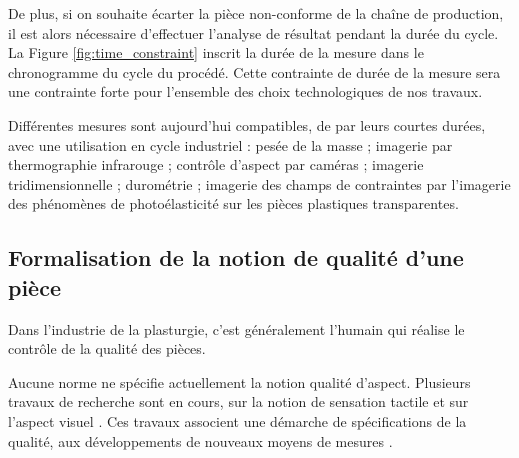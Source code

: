 De plus, si on souhaite écarter la pièce non-conforme de la chaîne de production, il est alors nécessaire d'effectuer l'analyse de résultat pendant la durée du cycle.
La Figure \ref{fig:time_constraint} inscrit la durée de la mesure dans le chronogramme du cycle du procédé.  %
Cette contrainte de durée de la mesure sera une contrainte forte pour l'ensemble des choix technologiques de nos travaux.

Différentes mesures sont aujourd'hui compatibles, de par leurs courtes durées, avec une utilisation en cycle industriel : pesée de la masse ; imagerie par thermographie infrarouge ; contrôle d'aspect par caméras ; imagerie tridimensionnelle \cite{schwenke_optical_2002} ; durométrie ; imagerie des champs de contraintes par l'imagerie des phénomènes de photoélasticité sur les pièces plastiques transparentes.


\subsection{Formalisation de la notion de qualité d'une pièce}
Dans l'industrie de la plasturgie, c'est généralement l'humain qui réalise le contrôle de la qualité des pièces.

Aucune norme ne spécifie actuellement la notion qualité d'aspect.
Plusieurs travaux de recherche sont en cours, sur la notion de sensation tactile \cite{bruno_albert_formalisation_2016, albert_generic_2016, albert_smart_2017, albert_smart_2019, albert_maitrise_2019} et sur l'aspect visuel \cite{desage_syntactic_2015}.
Ces travaux associent une démarche de spécifications de la qualité, aux développements de nouveaux moyens de mesures \cite{desage_constraints_2015, pitard_metrologie_2016, lacombe_exploitation_2018a}.

